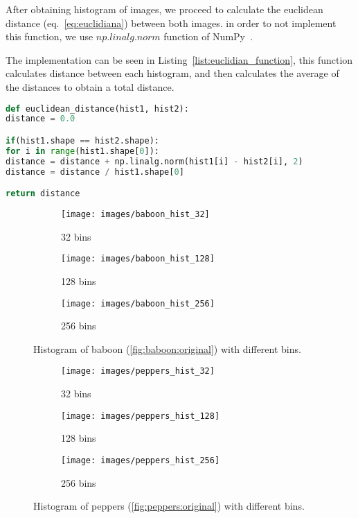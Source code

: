 \documentclass[journal]{IEEEtran}
\begin{document}
After obtaining histogram of images, we proceed to calculate the euclidean distance (eq.~\ref{eq:euclidiana}) between both images. in order to not implement this function, we use $np.linalg.norm$ function of NumPy~\cite{Walt2011}. 

The implementation can be seen in Listing~\ref{list:euclidian_function}, this function calculates distance between each histogram, and then calculates the average of the distances to obtain a total distance.


\begin{lstlisting}[language=Python, caption=Euclidean distance function, label=list:euclidian_function]
def euclidean_distance(hist1, hist2):
distance = 0.0

if(hist1.shape == hist2.shape):
for i in range(hist1.shape[0]):
distance = distance + np.linalg.norm(hist1[i] - hist2[i], 2)
distance = distance / hist1.shape[0]

return distance
\end{lstlisting}


\begin{figure}
	\centering
	\begin{subfigure}{0.15\textwidth}
		\centering
		\texttt{[image: images/baboon\_hist\_32]} 
		\caption{32 bins}
		\label{fig:baboon:hist:32}
	\end{subfigure}
	\centering
	\begin{subfigure}{0.15\textwidth}
		\centering
		\texttt{[image: images/baboon\_hist\_128]} 
		\caption{128 bins}
		\label{fig:baboon:hist:128}
	\end{subfigure}
	\centering
	\begin{subfigure}{0.15\textwidth}
		\centering
		\texttt{[image: images/baboon\_hist\_256]} 
		\caption{256 bins}
		\label{fig:baboon:hist:256}
	\end{subfigure}
	
	\caption{Histogram of baboon (\ref{fig:baboon:original}) with different bins.}
	\label{fig:baboon:hist}
\end{figure}

\begin{figure}
	\centering
	\begin{subfigure}{0.15\textwidth}
		\centering
		\texttt{[image: images/peppers\_hist\_32]} 
		\caption{32 bins}
		\label{fig:peppers:hist:32}
	\end{subfigure}
	\centering
	\begin{subfigure}{0.15\textwidth}
		\centering
		\texttt{[image: images/peppers\_hist\_128]} 
		\caption{128 bins}
		\label{fig:peppers:hist:128}
	\end{subfigure}
	\centering
	\begin{subfigure}{0.15\textwidth}
		\centering
		\texttt{[image: images/peppers\_hist\_256]} 
		\caption{256 bins}
		\label{fig:peppers:hist:256}
	\end{subfigure}
	
	\caption{Histogram of peppers (\ref{fig:peppers:original}) with different bins.}
	\label{fig:peppers:hist}
\end{figure}
\end{document}
